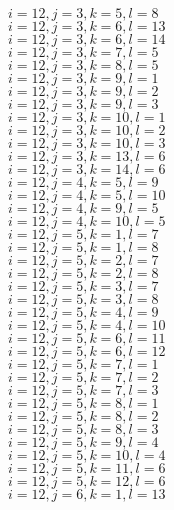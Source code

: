 \documentclass[14pt]{article}
\begin{document}
    $i=12,j=3,k=5,l=8 $ \\ 
    $i=12,j=3,k=6,l=13 $ \\ 
    $i=12,j=3,k=6,l=14 $ \\ 
    $i=12,j=3,k=7,l=5 $ \\ 
    $i=12,j=3,k=8,l=5 $ \\ 
    $i=12,j=3,k=9,l=1 $ \\ 
    $i=12,j=3,k=9,l=2 $ \\ 
    $i=12,j=3,k=9,l=3 $ \\ 
    $i=12,j=3,k=10,l=1 $ \\ 
    $i=12,j=3,k=10,l=2 $ \\ 
    $i=12,j=3,k=10,l=3 $ \\ 
    $i=12,j=3,k=13,l=6 $ \\ 
    $i=12,j=3,k=14,l=6 $ \\ 
    $i=12,j=4,k=5,l=9 $ \\ 
    $i=12,j=4,k=5,l=10 $ \\ 
    $i=12,j=4,k=9,l=5 $ \\ 
    $i=12,j=4,k=10,l=5 $ \\ 
    $i=12,j=5,k=1,l=7 $ \\ 
    $i=12,j=5,k=1,l=8 $ \\ 
    $i=12,j=5,k=2,l=7 $ \\ 
    $i=12,j=5,k=2,l=8 $ \\ 
    $i=12,j=5,k=3,l=7 $ \\ 
    $i=12,j=5,k=3,l=8 $ \\ 
    $i=12,j=5,k=4,l=9 $ \\ 
    $i=12,j=5,k=4,l=10 $ \\ 
    $i=12,j=5,k=6,l=11 $ \\ 
    $i=12,j=5,k=6,l=12 $ \\ 
    $i=12,j=5,k=7,l=1 $ \\ 
    $i=12,j=5,k=7,l=2 $ \\ 
    $i=12,j=5,k=7,l=3 $ \\ 
    $i=12,j=5,k=8,l=1 $ \\ 
    $i=12,j=5,k=8,l=2 $ \\ 
    $i=12,j=5,k=8,l=3 $ \\ 
    $i=12,j=5,k=9,l=4 $ \\ 
    $i=12,j=5,k=10,l=4 $ \\ 
    $i=12,j=5,k=11,l=6 $ \\ 
    $i=12,j=5,k=12,l=6 $ \\ 
    $i=12,j=6,k=1,l=13 $ \\ 
\end{document}
